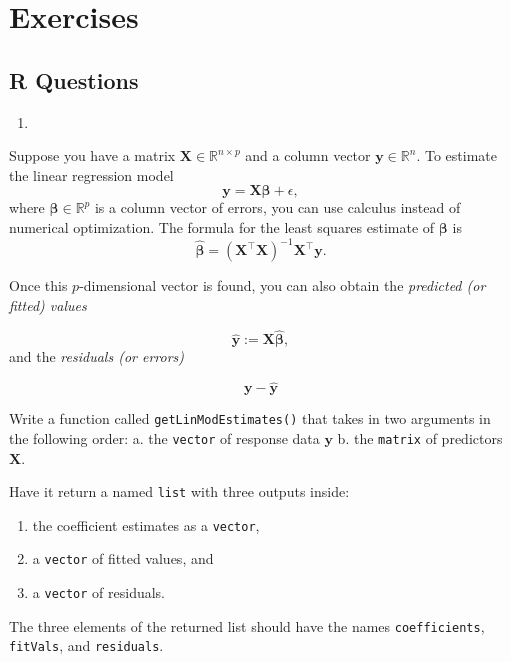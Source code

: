 \documentclass[
  12pt,
]{krantz}
\providecommand{\tightlist}{%
  \setlength{\itemsep}{0pt}\setlength{\parskip}{0pt}}
\begin{document}
\hypertarget{exercises-4}{%
\section{Exercises}\label{exercises-4}}

\hypertarget{r-questions-4}{%
\subsection{R Questions}\label{r-questions-4}}

\begin{enumerate}
\def\labelenumi{\arabic{enumi}.}
\tightlist
\item
\end{enumerate}

Suppose you have a matrix \(\mathbf{X} \in \mathbb{R}^{n \times p}\) and a column vector \(\mathbf{y} \in \mathbb{R}^{n}\). To estimate the linear regression model
\[
\mathbf{y} = \mathbf{X}\boldsymbol{\beta} + \epsilon,
\]
where \(\boldsymbol{\beta} \in \mathbb{R}^p\) is a column vector of errors, you can use calculus instead of numerical optimization. The formula for the least squares estimate of \(\boldsymbol{\beta}\) is
\[
\hat{\boldsymbol{\beta}} = (\mathbf{X}^\intercal \mathbf{X})^{-1} \mathbf{X}^\intercal \mathbf{y}.
\]

Once this \(p\)-dimensional vector is found, you can also obtain the \emph{predicted (or fitted) values}

\[
\hat{\mathbf{y}} := \mathbf{X}\hat{\boldsymbol{\beta}},
\]
and the \emph{residuals (or errors)}

\[
\mathbf{y} - \hat{\mathbf{y}}
\]

Write a function called \texttt{getLinModEstimates()} that takes in two arguments in the following order:
a. the \texttt{vector} of response data \(\mathbf{y}\)
b. the \texttt{matrix} of predictors \(\mathbf{X}\).

Have it return a named \texttt{list} with three outputs inside:

\begin{enumerate}
\def\labelenumi{\alph{enumi}.}
\tightlist
\item
  the coefficient estimates as a \texttt{vector},
\item
  a \texttt{vector} of fitted values, and
\item
  a \texttt{vector} of residuals.
\end{enumerate}

The three elements of the returned list should have the names \texttt{coefficients}, \texttt{fitVals}, and \texttt{residuals}.
\end{document}

